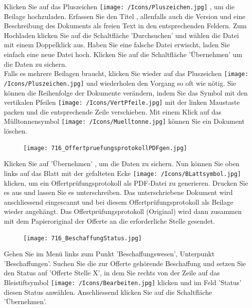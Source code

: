 Klicken Sie auf das Pluszeichen \texttt{[image: /Icons/Pluszeichen.jpg]} , um die Beilage hochzuladen. Erfassen Sie den Titel , allenfalls auch die Version  und eine Beschreibung des Dokuments  als freien Text in den entsprechenden Feldern. Zum Hochladen klicken Sie auf die Schaltfläche 'Durchsuchen'  und wählen die Datei mit einem Doppelklick aus. Haben Sie eine falsche Datei erwischt, laden Sie einfach eine neue Datei hoch. Klicken Sie auf die Schaltfläche 'Übernehmen' um die Daten zu sichern. \\
Falls es mehrere Beilagen braucht, klicken Sie wieder auf das Pluszeichen \texttt{[image: /Icons/Pluszeichen.jpg]}  und wiederholen den Vorgang so oft wie nötig. Sie können die Reihenfolge der Dokumente verändern, indem Sie das Symbol mit den vertikalen Pfeilen \texttt{[image: /Icons/VertPfeile.jpg]}  mit der linken Maustaste packen und die entsprechende Zeile verschieben. Mit einem Klick auf das Mülltonnensymbol \texttt{[image: /Icons/Muelltonne.jpg]}  können Sie ein Dokument löschen.

\vspace{\baselineskip}

\begin{figure}
\vspace{-15pt}
\texttt{[image: 716\_OffertpruefungsprotokollPDFgen.jpg]}
\end{figure}
Klicken Sie auf 'Übernehmen' , um die Daten zu sichern. Nun können Sie oben links auf das
Blatt mit der gefalteten Ecke \texttt{[image: /Icons/BLattsymbol.jpg]} klicken, um ein Offertprüfungsprotokoll als PDF-Datei zu generieren. Drucken Sie es aus und lassen Sie es unterschreiben. Das unterschriebene Dokument wird anschliessend eingescannt und bei diesem Offertprüfungsprotokoll als
Beilage wieder angehängt. Das Offertprüfungsprotokoll (Original) wird dann zusammen mit dem Papieroriginal der Offerte an die erforderliche Stelle gesendet.

\vspace{\baselineskip}

\begin{figure}
\vspace{-15pt}
\texttt{[image: 716\_BeschaffungStatus.jpg]}
\end{figure}
Gehen Sie im Menü links zum Punkt 'Beschaffungswesen', Unterpunkt 'Beschaffungen'. Suchen Sie die zur Offerte gehörende
Beschaffung und setzen Sie den Status auf 'Offerte Stelle X', in dem Sie rechts von der Zeile auf das Bleistiftsymbol \texttt{[image: /Icons/Bearbeiten.jpg]} klicken und im Feld 'Status' diesen Status anwählen. Anschliessend klicken Sie auf die Schaltfläche 'Übernehmen'.

